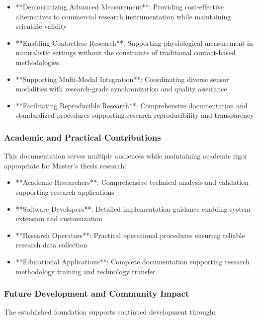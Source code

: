 \documentclass[11pt,a4paper]{article}
\begin{document}
\begin{itemize}
\item **Democratizing Advanced Measurement**: Providing cost-effective alternatives to commercial research instrumentation
  while maintaining scientific validity
\item **Enabling Contactless Research**: Supporting physiological measurement in naturalistic settings without the
  constraints of traditional contact-based methodologies
\item **Supporting Multi-Modal Integration**: Coordinating diverse sensor modalities with research-grade synchronization and
  quality assurance
\item **Facilitating Reproducible Research**: Comprehensive documentation and standardized procedures supporting research
  reproducibility and transparency

\end{itemize}
\subsubsection{Academic and Practical Contributions}

This documentation serves multiple audiences while maintaining academic rigor appropriate for Master's thesis research:

\begin{itemize}
\item **Academic Researchers**: Comprehensive technical analysis and validation supporting research applications
\item **Software Developers**: Detailed implementation guidance enabling system extension and customization
\item **Research Operators**: Practical operational procedures ensuring reliable research data collection
\item **Educational Applications**: Complete documentation supporting research methodology training and technology transfer

\end{itemize}
\subsubsection{Future Development and Community Impact}

The established foundation supports continued development through:
\end{document}
